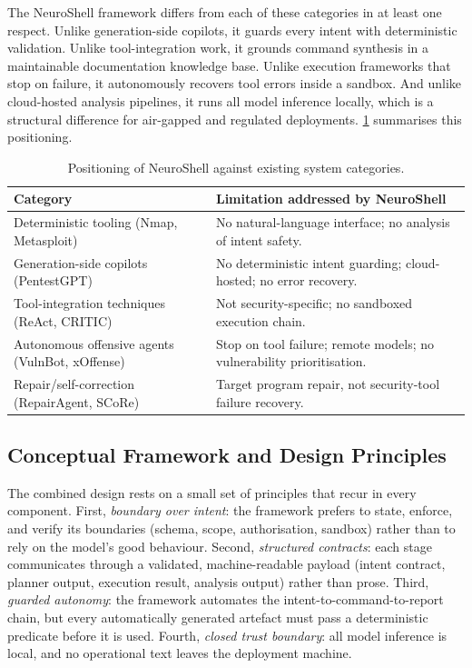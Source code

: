 The NeuroShell framework differs from each of these categories in at least one
respect. Unlike generation-side copilots, it guards every intent with
deterministic validation. Unlike tool-integration work, it grounds command
synthesis in a maintainable documentation knowledge base. Unlike execution
frameworks that stop on failure, it autonomously recovers tool errors inside a
sandbox. And unlike cloud-hosted analysis pipelines, it runs all model inference
locally, which is a structural difference for air-gapped and regulated
deployments. \cref{tab:existing-chart} summarises this positioning.

\begin{table}[htbp]
  \centering
  \begin{tabular}{@{}p{}p{}@{}}
    \toprule
    \textbf{Category} & \textbf{Limitation addressed by NeuroShell}\\
    \midrule
    Deterministic tooling (Nmap, Metasploit) & No natural-language interface; no analysis of intent safety.\\
    Generation-side copilots (PentestGPT) & No deterministic intent guarding; cloud-hosted; no error recovery.\\
    Tool-integration techniques (ReAct, CRITIC) & Not security-specific; no sandboxed execution chain.\\
    Autonomous offensive agents (VulnBot, xOffense) & Stop on tool failure; remote models; no vulnerability prioritisation.\\
    Repair/self-correction (RepairAgent, SCoRe) & Target program repair, not security-tool failure recovery.\\
    \bottomrule
  \end{tabular}
  \caption{Positioning of NeuroShell against existing system categories.}\label{tab:existing-chart}
\end{table}

\subsection{Conceptual Framework and Design Principles}\label{sec:conceptual}

The combined design rests on a small set of principles that recur in every
component. First, \emph{boundary over intent}: the framework prefers to state,
enforce, and verify its boundaries (schema, scope, authorisation, sandbox)
rather than to rely on the model's good behaviour. Second, \emph{structured
contracts}: each stage communicates through a validated, machine-readable
payload (intent contract, planner output, execution result, analysis output)
rather than prose. Third, \emph{guarded autonomy}: the framework automates the
intent-to-command-to-report chain, but every automatically generated artefact
must pass a deterministic predicate before it is used. Fourth, \emph{closed
trust boundary}: all model inference is local, and no operational text leaves
the deployment machine.

